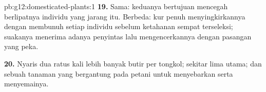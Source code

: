 \begin{solution}{pb:g12:domesticated-plants:1}
\textbf{19.} Sama: keduanya bertujuan mencegah berlipatnya individu
 yang jarang itu. Berbeda: kur penuh menyingkirkannya dengan
membunuh setiap individu sebelum ketahanan sempat terseleksi;
suakanya menerima adanya penyintas lalu mengencerkannya dengan
pasangan yang peka.

\textbf{20.} Nyaris dua ratus kali lebih banyak butir per tongkol;
sekitar lima  utama; dan sebuah tanaman yang bergantung pada petani
untuk menyebarkan serta menyemainya.
\end{solution}

